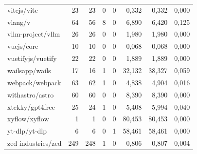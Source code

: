 \begin{tabular}{lrrrrrrr}
vitejs/vite & 23 & 23 & 0 & 0 & 0,332 & 0,332 & 0,000 \\
vlang/v & 64 & 56 & 8 & 0 & 6,890 & 6,420 & 0,125 \\
vllm-project/vllm & 26 & 26 & 0 & 0 & 1,980 & 1,980 & 0,000 \\
vuejs/core & 10 & 10 & 0 & 0 & 0,068 & 0,068 & 0,000 \\
vuetifyjs/vuetify & 22 & 22 & 0 & 0 & 1,889 & 1,889 & 0,000 \\
wailsapp/wails & 17 & 16 & 1 & 0 & 32,132 & 38,327 & 0,059 \\
webpack/webpack & 63 & 62 & 1 & 0 & 4,838 & 4,904 & 0,016 \\
withastro/astro & 60 & 60 & 0 & 0 & 8,390 & 8,390 & 0,000 \\
xtekky/gpt4free & 25 & 24 & 1 & 0 & 5,408 & 5,994 & 0,040 \\
xyflow/xyflow & 1 & 1 & 0 & 0 & 80,453 & 80,453 & 0,000 \\
yt-dlp/yt-dlp & 6 & 6 & 0 & 1 & 58,461 & 58,461 & 0,000 \\
zed-industries/zed & 249 & 248 & 1 & 0 & 0,806 & 0,807 & 0,004 \\
\hline
\end{tabular}
